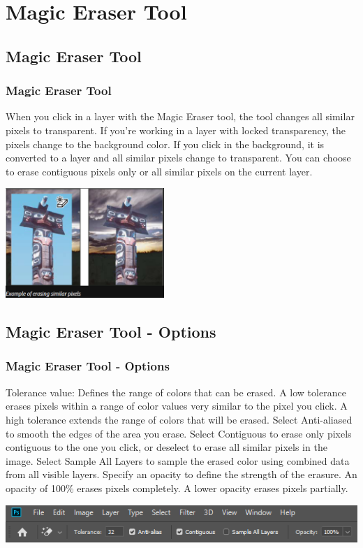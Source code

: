 \documentclass{beamer}
\begin{document}
	\section{Magic Eraser Tool}
	\subsection{Magic Eraser Tool}
\begin{frame}
	\frametitle{Magic Eraser Tool}
	\begin{outline}
		\1 When you click in a layer with the Magic Eraser tool, the tool changes all similar pixels to transparent. 
		\1 If you’re working in a layer with locked transparency, the pixels change to the background color. 
		\1 If you click in the background, it is converted to a layer and all similar pixels change to transparent.
		\1 You can choose to erase contiguous pixels only or all similar pixels on the current layer.
	\end{outline}
	\begin{center}
		\includegraphics[width = 0.45\textwidth]{images/magic eraser.png}
	\end{center}
\end{frame}

	\subsection{Magic Eraser Tool - Options}
\begin{frame}
	\frametitle{Magic Eraser Tool - Options}
	\begin{outline}
		\1 Tolerance value: 
		\2 Defines the range of colors that can be erased. A low tolerance erases pixels within a range of color values very similar to the pixel you click. A high tolerance extends the range of colors that will be erased.
		\1 Select Anti-aliased to smooth the edges of the area you erase.
		\1 Select Contiguous to erase only pixels contiguous to the one you click, or deselect to erase all similar pixels in the image.
		\1 Select Sample All Layers to sample the erased color using combined data from all visible layers.
		\1 Specify an opacity to define the strength of the erasure. An opacity of 100\% erases pixels completely. A lower opacity erases pixels partially.
	\end{outline}
	\begin{center}
		\includegraphics[width = 1.0\textwidth]{images/magic eraser 2.png}
	\end{center}
\end{frame}
	
\end{document}
